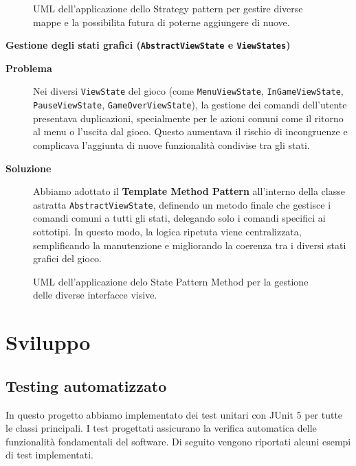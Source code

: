 \documentclass[a4paper,12pt]{report}
\begin{document}
\begin{figure}[H]
	\centering{}
	
	\caption{UML dell'applicazione dello Strategy pattern per gestire diverse mappe e la possibilita futura di poterne aggiungere di nuove.}
	\label{img:GameMapsManager}
\end{figure}
\newpage
\noindent
\textbf{Gestione degli stati grafici (\texttt{AbstractViewState} e \texttt{ViewStates})}
\begin{description}
	\item[\textbf{Problema}]
	      Nei diversi \texttt{ViewState} del gioco (come \texttt{MenuViewState}, \newline \texttt{InGameViewState}, \texttt{PauseViewState}, \texttt{GameOverViewState}), la gestione dei comandi dell'utente
	      presentava duplicazioni, specialmente per le azioni comuni come il ritorno al menu o l'uscita dal gioco. Questo aumentava il rischio di incongruenze e complicava l'aggiunta di nuove
	      funzionalità condivise tra gli stati.

	\item[\textbf{Soluzione}]
	      Abbiamo adottato il \textbf{Template Method Pattern} all'interno della classe astratta \texttt{AbstractViewState}, definendo un metodo finale che gestisce i comandi comuni a tutti gli stati,
	      delegando solo i comandi specifici ai sottotipi. In questo modo, la logica ripetuta viene centralizzata, semplificando la manutenzione e migliorando la coerenza tra i diversi stati grafici del gioco.
\end{description}
\begin{figure}[H]
	\centering{}
	
	\caption{UML dell'applicazione delo State Pattern Method per la gestione delle diverse interfacce visive.}
	\label{img:AbstractViewState}
\end{figure}
\newpage
\chapter{Sviluppo}
\section{Testing automatizzato}
In questo progetto abbiamo implementato dei test unitari con JUnit 5 per tutte le classi principali. I test progettati assicurano la verifica automatica delle funzionalità fondamentali del software. Di seguito vengono riportati alcuni esempi di test implementati.
\end{document}
